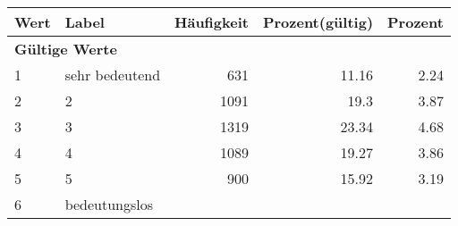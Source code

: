      \begin{longtable}{lXrrr}
     \toprule
     \textbf{Wert} & \textbf{Label} & \textbf{Häufigkeit} & \textbf{Prozent(gültig)} & \textbf{Prozent} \\
     \endhead
     \midrule
     \multicolumn{5}{l}{\textbf{Gültige Werte}}\\

     1 &
     \multicolumn{1}{X}{ sehr bedeutend   } &


       \num{631} &
       \num[round-mode=places,round-precision=2]{11,16} &
         \num[round-mode=places,round-precision=2]{2,24} \\

     2 &
     \multicolumn{1}{X}{ 2   } &


       \num{1091} &
       \num[round-mode=places,round-precision=2]{19,3} &
         \num[round-mode=places,round-precision=2]{3,87} \\

     3 &
     \multicolumn{1}{X}{ 3   } &


       \num{1319} &
       \num[round-mode=places,round-precision=2]{23,34} &
         \num[round-mode=places,round-precision=2]{4,68} \\

     4 &
     \multicolumn{1}{X}{ 4   } &


       \num{1089} &
       \num[round-mode=places,round-precision=2]{19,27} &
         \num[round-mode=places,round-precision=2]{3,86} \\

     5 &
     \multicolumn{1}{X}{ 5   } &


       \num{900} &
       \num[round-mode=places,round-precision=2]{15,92} &
         \num[round-mode=places,round-precision=2]{3,19} \\

     6 &
     \multicolumn{1}{X}{ bedeutungslos   } &



\end{longtable}
